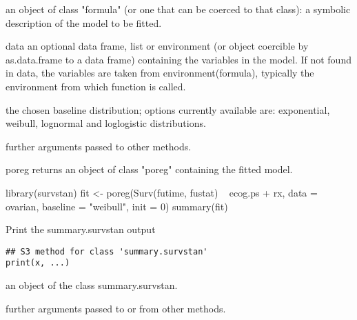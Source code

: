 \documentclass[letterpaper]{book}
\begin{document}
\begin{Arguments}
\begin{ldescription}
\item[\code{formula}] an object of class "formula" (or one that can be coerced to that class): a symbolic description of the model to be fitted.

\item[\code{data}] data an optional data frame, list or environment (or object coercible by as.data.frame to a data frame) containing the variables in the model. If not found in data, the variables are taken from environment(formula), typically the environment from which function is called.

\item[\code{baseline}] the chosen baseline distribution; options currently available are: exponential, weibull, lognormal and loglogistic distributions.

\item[\code{...}] further arguments passed to other methods.
\end{ldescription}
\end{Arguments}
%
\begin{Value}
poreg returns an object of class "poreg" containing the fitted model.
\end{Value}
%
\begin{Examples}
\begin{ExampleCode}

library(survstan)
fit <- poreg(Surv(futime, fustat) ~ ecog.ps + rx, data = ovarian, baseline = "weibull", init = 0)
summary(fit)



\end{ExampleCode}
\end{Examples}
%
\begin{Description}\relax
Print the summary.survstan output
\end{Description}
%
\begin{Usage}
\begin{verbatim}
## S3 method for class 'summary.survstan'
print(x, ...)
\end{verbatim}
\end{Usage}
%
\begin{Arguments}
\begin{ldescription}
\item[\code{x}] an object of the class summary.survstan.

\item[\code{...}] further arguments passed to or from other methods.
\end{ldescription}
\end{Arguments}
\end{document}
